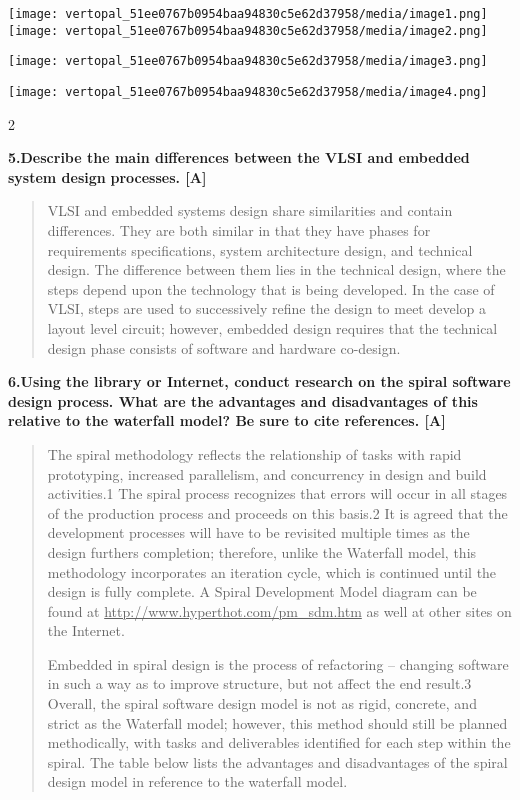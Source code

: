\documentclass[
]{article}
\begin{document}
\texttt{[image: vertopal\_51ee0767b0954baa94830c5e62d37958/media/image1.png]}\texttt{[image: vertopal\_51ee0767b0954baa94830c5e62d37958/media/image2.png]}

\texttt{[image: vertopal\_51ee0767b0954baa94830c5e62d37958/media/image3.png]}

\texttt{[image: vertopal\_51ee0767b0954baa94830c5e62d37958/media/image4.png]}

2

\textbf{5.Describe the main differences between the VLSI and embedded
system design} \textbf{processes. {[}A{]}}

\begin{quote}
VLSI and embedded systems design share similarities and contain
differences. They are both similar in that they have phases for
requirements specifications, system architecture design, and technical
design. The difference between them lies in the technical design, where
the steps depend upon the technology that is being developed. In the
case of VLSI, steps are used to successively refine the design to meet
develop a layout level circuit; however, embedded design requires that
the technical design phase consists of software and hardware co-design.
\end{quote}

\textbf{6.Using the library or Internet, conduct research on the spiral
software design process. What are the advantages and disadvantages of
this relative to the waterfall model? Be sure to cite references.
{[}A{]}}

\begin{quote}
The spiral methodology reflects the relationship of tasks with rapid
prototyping, increased parallelism, and concurrency in design and build
activities.1 The spiral process recognizes that errors will occur in all
stages of the production process and proceeds on this basis.2 It is
agreed that the development processes will have to be revisited multiple
times as the design furthers completion; therefore, unlike the Waterfall
model, this methodology incorporates an iteration cycle, which is
continued until the design is fully complete. A Spiral Development Model
diagram can be found at \uline{http://www.hyperthot.com/pm\_sdm.htm} as
well at other sites on the Internet.

Embedded in spiral design is the process of refactoring -- changing
software in such a way as to improve structure, but not affect the end
result.3 Overall, the spiral software design model is not as rigid,
concrete, and strict as the Waterfall model; however, this method should
still be planned methodically, with tasks and deliverables identified
for each step within the spiral. The table below lists the advantages
and disadvantages of the spiral design model in reference to the
waterfall model.
\end{quote}
\end{document}
